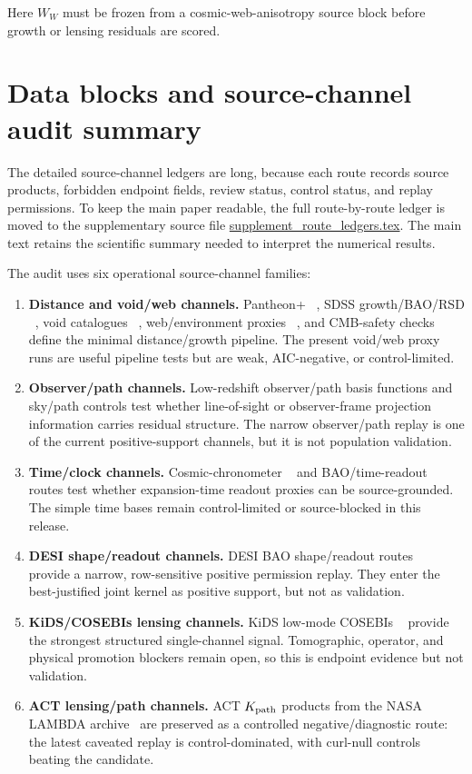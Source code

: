 \documentclass[11pt]{article}
\begin{document}
Here \(W_W\) must be frozen from a cosmic-web-anisotropy source block before
growth or lensing residuals are scored.


\section{Data blocks and source-channel audit summary}

The detailed source-channel ledgers are long, because each route records source
products, forbidden endpoint fields, review status, control status, and replay
permissions.  To keep the main paper readable, the full route-by-route ledger is
moved to the supplementary source file
\url{supplement_route_ledgers.tex}.  The main text retains the scientific
summary needed to interpret the numerical results.

The audit uses six operational source-channel families:

\begin{enumerate}[leftmargin=1.5em]
\item \textbf{Distance and void/web channels.} Pantheon+
~\cite{PantheonPlus2022}, SDSS growth/BAO/RSD
~\cite{SDSSDR16LSS,duMasdesBourboux2020LyA,Hou2020QSOBAORSD}, void catalogues
~\cite{VASTSDSSDR7VoidZenodo}, web/environment proxies
~\cite{SDSSCosmicWebVAC}, and CMB-safety checks
~\cite{Planck2018Cosmology,PlanckLegacyArchive,NASALAMBDA} define the minimal
distance/growth pipeline.  The present void/web proxy runs are useful pipeline
tests but are weak, AIC-negative, or control-limited.
\item \textbf{Observer/path channels.} Low-redshift observer/path basis functions
and sky/path controls test whether line-of-sight or observer-frame projection
information carries residual structure.  The narrow observer/path replay is one
of the current positive-support channels, but it is not population validation.
\item \textbf{Time/clock channels.} Cosmic-chronometer
~\cite{Simon2005Chronometers,Moresco2012ExpansionRate,Moresco2023ChronometersReview}
and BAO/time-readout routes test whether expansion-time readout proxies can be
source-grounded.  The simple time bases remain control-limited or source-blocked
in this release.
\item \textbf{DESI shape/readout channels.} DESI BAO shape/readout routes
~\cite{DESIDR2BAO2025,DESIDR2Products2025} provide a narrow, row-sensitive
positive permission replay.  They enter the best-justified joint kernel as
positive support, but not as validation.
\item \textbf{KiDS/COSEBIs lensing channels.} KiDS low-mode COSEBIs
~\cite{KiDS1000Lensing} provide the strongest structured single-channel signal.
Tomographic, operator, and physical promotion blockers remain open, so this is
endpoint evidence but not validation.
\item \textbf{ACT lensing/path channels.} ACT \(K_{\rm path}\) products from the
NASA LAMBDA archive~\cite{NASALAMBDA} are preserved as a controlled
negative/diagnostic route: the latest caveated replay is control-dominated, with
curl-null controls beating the candidate.
\end{enumerate}
\end{document}
